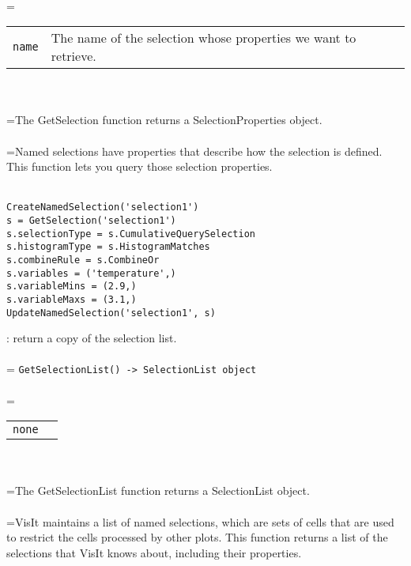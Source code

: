 \documentclass[10pt,a4paper]{report}
\begin{document}
 \\ 
\hangindent=\parindent 
\begin{tabular}{lp{9cm}}
\verb!name! & The name of the selection whose properties we want to retrieve. \\
\end{tabular} \\[-2mm]


 \\ 
\hangindent=\parindent The GetSelection function returns a SelectionProperties object. \\[-3mm] 

 \\ 
\hangindent=\parindent Named selections have properties that describe how the selection is defined. This function lets you query those selection properties. \\[-3mm] 

\\[-6mm]
\begin{verbatim}CreateNamedSelection('selection1')
s = GetSelection('selection1')
s.selectionType = s.CumulativeQuerySelection
s.histogramType = s.HistogramMatches
s.combineRule = s.CombineOr
s.variables = ('temperature',)
s.variableMins = (2.9,)
s.variableMaxs = (3.1,)
UpdateNamedSelection('selection1', s)
\end{verbatim}
\newpage


{}
: return a copy of the selection list.\\[-3mm]

 \\ 
\hangindent=\parindent 
\verb!GetSelectionList() -> SelectionList object!\\ [-3mm]

 \\ 
\hangindent=\parindent 
\begin{tabular}{ll}
\verb!none! &  \\
\end{tabular} \\[-2mm]


 \\ 
\hangindent=\parindent The GetSelectionList function returns a SelectionList object. \\[-3mm] 

 \\ 
\hangindent=\parindent VisIt maintains a list of named selections, which are sets of cells that are used to restrict the cells processed by other plots. This function returns a list of the selections that VisIt knows about, including their properties. \\[-3mm] 
\end{document}
